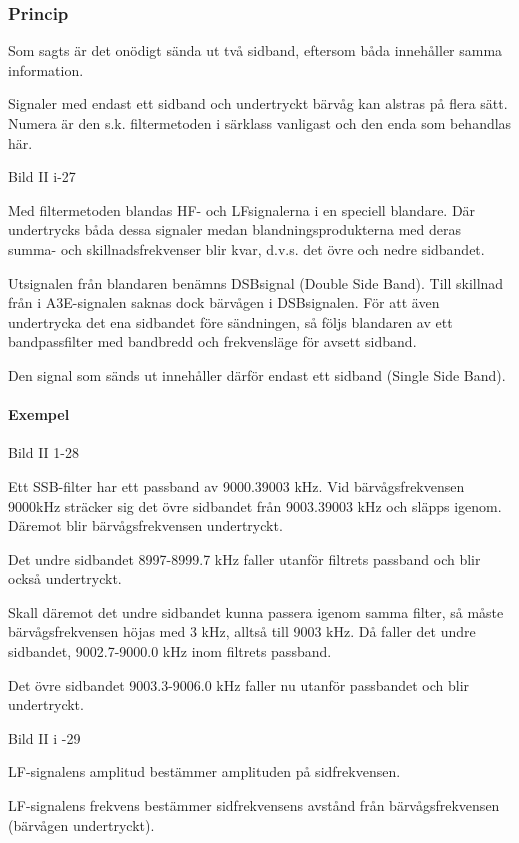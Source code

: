 \subsubsection{Princip}

Som sagts är det onödigt sända ut två sidband, eftersom båda innehåller samma information.

Signaler med endast ett sidband och undertryckt bärvåg kan alstras på flera sätt.
Numera är den s.k. filtermetoden i särklass vanligast och den enda som behandlas här.

Bild II i-27

Med filtermetoden blandas HF- och LFsignalerna i en speciell blandare. Där undertrycks
båda dessa signaler medan blandningsprodukterna med deras summa- och skillnadsfrekvenser
blir kvar, d.v.s. det övre och nedre sidbandet.

Utsignalen från blandaren benämns DSBsignal (Double Side Band). Till skillnad från
i A3E-signalen saknas dock bärvågen i DSBsignalen. För att även undertrycka det ena
sidbandet före sändningen, så följs blandaren av ett bandpassfilter med bandbredd
och frekvensläge för avsett sidband.

Den signal som sänds ut innehåller därför endast ett sidband (Single Side Band).

\paragraph{Exempel}

Bild II 1-28

Ett SSB-filter har ett passband av 9000.39003 kHz. Vid bärvågsfrekvensen 9000kHz
sträcker sig det övre sidbandet från 9003.39003 kHz och släpps igenom. Däremot blir
bärvågsfrekvensen undertryckt.

Det undre sidbandet 8997-8999.7 kHz faller utanför filtrets passband och blir också
undertryckt.

Skall däremot det undre sidbandet kunna passera igenom samma filter, så måste
bärvågsfrekvensen höjas med 3 kHz, alltså till 9003 kHz. Då faller det undre sidbandet,
9002.7-9000.0 kHz inom filtrets passband.

Det övre sidbandet 9003.3-9006.0 kHz faller nu utanför passbandet och blir undertryckt.

Bild II i -29

LF-signalens amplitud bestämmer amplituden på sidfrekvensen.

LF-signalens frekvens bestämmer sidfrekvensens avstånd från bärvågsfrekvensen (bärvågen
undertryckt).

